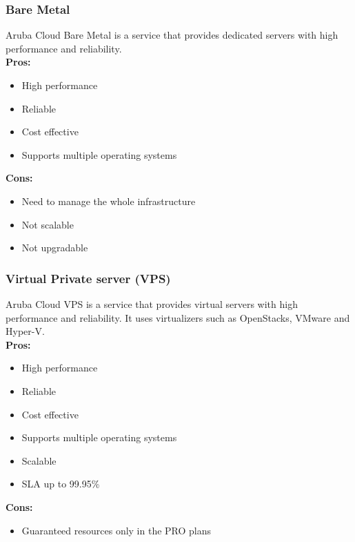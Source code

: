     \subsubsection{Bare Metal}
    \label{aruba-cloud:bare-metal}
    Aruba Cloud Bare Metal is a service that provides dedicated servers with high performance and reliability.\\
    \textbf{Pros:}
    \begin{itemize}
        \item High performance
        \item Reliable
        \item Cost effective
        \item Supports multiple operating systems
    \end{itemize}
    \textbf{Cons:}
    \begin{itemize}
        \item  Need to manage the whole infrastructure
        \item Not scalable
        \item Not upgradable
    \end{itemize}

    \subsubsection{Virtual Private server (VPS)}
    \label{aruba-cloud:vps}
    Aruba Cloud VPS is a service that provides virtual servers with high performance and reliability. It uses virtualizers such as OpenStacks, VMware and Hyper-V.\\
    \textbf{Pros:}
    \begin{itemize}
        \item High performance
        \item Reliable
        \item Cost effective
        \item Supports multiple operating systems
        \item Scalable
        \item SLA up to 99.95\%
    \end{itemize}
    \textbf{Cons:}
    \begin{itemize}
        \item Guaranteed resources only in the PRO plans
    \end{itemize}

